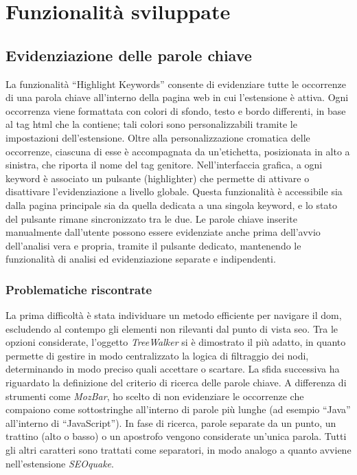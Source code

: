 \chapter{Funzionalità sviluppate}
\label{cap:funzionalità-sviluppate}

\section{Evidenziazione delle parole chiave}
\label{sec:highlight-keyword}

\par La funzionalità “Highlight Keywords” consente di evidenziare tutte le occorrenze di una parola chiave all’interno della pagina web in cui l’estensione è attiva. Ogni occorrenza viene formattata con colori di sfondo, testo e bordo differenti, in base al tag \gls{html} che la contiene; tali colori sono personalizzabili tramite le impostazioni dell’estensione. Oltre alla personalizzazione cromatica delle occorrenze, ciascuna di esse è accompagnata da un’etichetta, posizionata in alto a sinistra, che riporta il nome del tag genitore. Nell’interfaccia grafica, a ogni keyword è associato un pulsante (highlighter) che permette di attivare o disattivare l’evidenziazione a livello globale. Questa funzionalità è accessibile sia dalla pagina principale sia da quella dedicata a una singola keyword, e lo stato del pulsante rimane sincronizzato tra le due. Le parole chiave inserite manualmente dall'utente possono essere evidenziate anche prima dell’avvio dell’analisi vera e propria, tramite il pulsante dedicato, mantenendo le funzionalità di analisi ed evidenziazione separate e indipendenti.

\subsection{Problematiche riscontrate}

\par La prima difficoltà è stata individuare un metodo efficiente per navigare il \gls{dom}, escludendo al contempo gli elementi non rilevanti dal punto di vista \gls{seo}. Tra le opzioni considerate, l’oggetto \textit{TreeWalker} si è dimostrato il più adatto, in quanto permette di gestire in modo centralizzato la logica di filtraggio dei nodi, determinando in modo preciso quali accettare o scartare. La sfida successiva ha riguardato la definizione del criterio di ricerca delle parole chiave. A differenza di strumenti come \textit{MozBar}, ho scelto di non evidenziare le occorrenze che compaiono come sottostringhe all’interno di parole più lunghe (ad esempio “Java” all’interno di “JavaScript”). In fase di ricerca, parole separate da un punto, un trattino (alto o basso) o un apostrofo vengono considerate un’unica parola. Tutti gli altri caratteri sono trattati come separatori, in modo analogo a quanto avviene nell’estensione \textit{SEOquake}.


